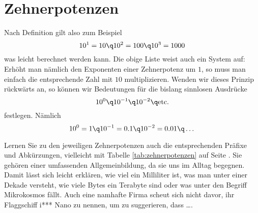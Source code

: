 \documentclass[
twoside,%
ngerman,%
headsepline%
11pt]%
{article}
\begin{document}
\section{Zehnerpotenzen}
Nach Definition gilt also zum Beispiel
$$10^1=10\q10^2=100\q10^3=1000$$
was leicht berechnet werden kann. Die obige Liste weist auch ein System auf: Erh\"oht man n\"amlich den Exponenten einer Zehnerpotenz um $1$, so muss man einfach die entsprechende Zahl mit $10$ multiplizieren. Wenden wir dieses Prinzip r\"uckw\"arts an, so k\"onnen wir Bedeutungen f\"ur die bislang sinnlosen Ausdr\"ucke
$$10^0\q10^{-1}\q10^{-2}\q\text{etc.}$$
festlegen. N\"amlich
$$10^0=1\q10^{-1}=0.1\q10^{-2}=0.01\q\dots$$

Lernen Sie zu den jeweiligen Zehnerpotenzen auch die entsprechenden Pr\"afixe und Ab\-k\"ur\-zungen, vielleicht mit Tabelle \ref{tab:zehnerpotenzen} auf Seite \pageref{tab:zehnerpotenzen}. Sie geh\"oren einer umfassenden Allgemeinbildung, da sie uns im Alltag begegnen. Damit l\"asst sich leicht erkl\"aren, wie viel ein Milliliter ist, was man unter einer Dekade versteht, wie viele Bytes ein Terabyte sind oder was unter den Begriff Mikrokosmos f\"allt. Auch eine namhafte Firma scheut sich nicht davor, ihr Flaggschiff i*** Nano zu nennen, um zu suggerieren, dass \dots.
\end{document}

